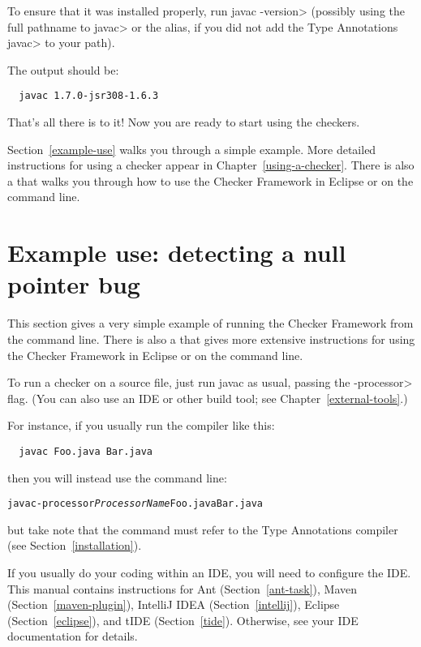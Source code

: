 To ensure that it was installed properly, run \<javac -version> (possibly using the
full pathname to \<javac> or the alias, if you did not add the Type Annotations \<javac> to your path).

The output should be:

\begin{Verbatim}
  javac 1.7.0-jsr308-1.6.3
\end{Verbatim}

That's all there is to it!  Now you are ready to start using the checkers.

Section~\ref{example-use} walks you through a simple example.  More detailed
instructions for using a checker appear in Chapter~\ref{using-a-checker}.
There is also a 
that walks you through how to use the Checker Framework in Eclipse or on
the command line.


\section{Example use:  detecting a null pointer bug\label{example-use}}

This section gives a very simple example of running the Checker Framework
from the command line.  There is also a 
that gives more extensive instructions for using the Checker Framework in
Eclipse or on the command line.


To run a checker on a source file, just run javac as usual, passing the
\<-processor> flag.  (You can also use an IDE or other build tool; see
Chapter~\ref{external-tools}.)

For instance, if you usually run the compiler like
this:

\begin{Verbatim}
  javac Foo.java Bar.java
\end{Verbatim}

\noindent
then you will instead use the command line:

\begin{alltt}
  javac -processor \textit{ProcessorName} Foo.java Bar.java
\end{alltt}

\noindent
but take note that the  command must refer to the Type
Annotations compiler (see Section~\ref{installation}).


If you usually do your coding within an IDE, you will need to configure
the IDE.  This manual contains instructions for
Ant (Section~\ref{ant-task}),
Maven (Section~\ref{maven-plugin}),
IntelliJ IDEA (Section~\ref{intellij}),
Eclipse (Section~\ref{eclipse}), and
tIDE (Section~\ref{tide}).
Otherwise, see your IDE documentation for details.


